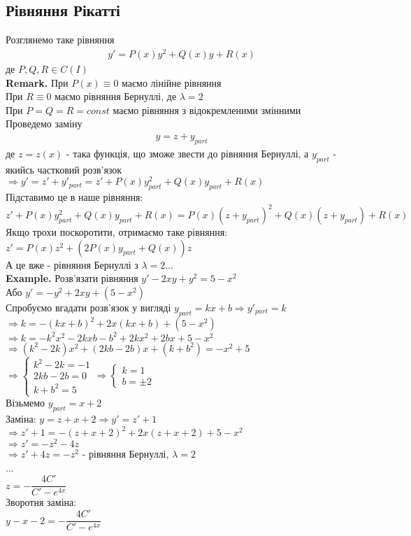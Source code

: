 \documentclass[a4paper, 14pt]{extarticle}
\def\bigline{\vspace{5mm}\\}
\begin{document}
\subsection{Рівняння Рікатті}
Розглянемо таке рівняння
\begin{align*}
y' = P(x)y^2 + Q(x)y + R(x)
\end{align*}
де $P,Q,R \in C(I)$ \bigline
\textbf{Remark.} При $P(x) \equiv 0$ маємо лінійне рівняння\\
При $R \equiv 0$ маємо рівняння Бернуллі, де $\lambda = 2$\\
При $P = Q = R = const$ маємо рівняння з відокремленими змінними
\bigline
Проведемо заміну
\begin{align*}
y = z + y_{part}
\end{align*}
де $z = z(x)$ - така функція, що зможе звести до рівняння Бернуллі, а $y_{part}$ - якийсь частковий розв'язок\\
$\Rightarrow y' = z' + y'_{part} = z' + P(x)y_{part}^2 + Q(x)y_{part} + R(x)$\\
Підставимо це в наше рівняння:\\
$z' + P(x)y_{part}^2 + Q(x)y_{part} + R(x) = P(x)(z + y_{part})^2 + Q(x)(z + y_{part}) + R(x)$\\
Якщо трохи поскоротити, отримаємо таке рівняння:\\
$z' = P(x)z^2 + (2P(x)y_{part} + Q(x))z$\\
А це вже - рівняння Бернуллі з $\lambda = 2$...
\bigline
\textbf{Example.} Розв'язати рівняння $y' - 2xy+y^2 = 5-x^2$\\
Або $y' = -y^2 + 2xy + (5-x^2)$\\
Спробуємо вгадати розв'язок у вигляді $y_{part} = kx + b \Rightarrow y'_{part} = k$\\
$\Rightarrow k = -(kx+b)^2 + 2x(kx+b) + (5-x^2)$\\
$\Rightarrow k = -k^2x^2 - 2kxb - b^2 + 2kx^2 + 2bx + 5 - x^2$\\
$\Rightarrow (k^2-2k)x^2 + (2kb-2b)x + (k+b^2) = -x^2 + 5$\\
$\Rightarrow \begin{cases}
k^2 - 2k = -1\\
2kb - 2b = 0\\
k+b^2=5
\end{cases} \Rightarrow \begin{cases} k = 1 \\ b = \pm 2 \end{cases}$\\
Візьмемо $y_{part} = x + 2$
\bigline
Заміна: $y = z + x + 2 \Rightarrow y' = z' + 1$\\
$\Rightarrow z' + 1 = -(z+x+2)^2 + 2x(z+x+2) + 5 - x^2$\\
$\Rightarrow z' = -z^2 - 4z$\\
$\Rightarrow z' + 4z = -z^2$ - рівняння Бернуллі, $\lambda = 2$\\
...\\
$z = -\dfrac{4C'}{C' - e^{4x}}$\\
Зворотня заміна:\\
$y-x-2 = -\dfrac{4C'}{C' - e^{4x}}$
\bigline
\end{document}
